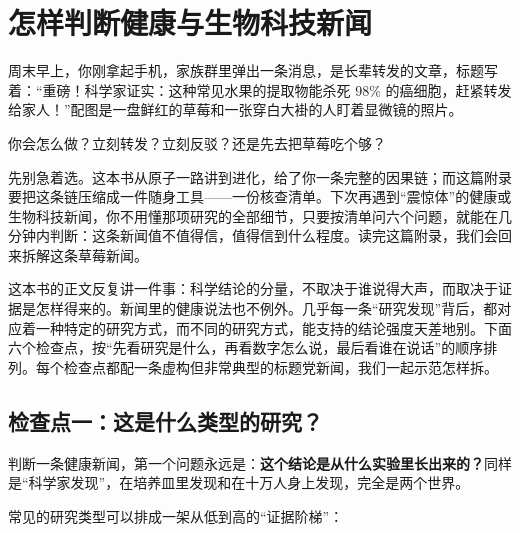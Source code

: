 \chapter{怎样判断健康与生物科技新闻}

\begin{kaichang}
周末早上，你刚拿起手机，家族群里弹出一条消息，是长辈转发的文章，标题写着：“重磅！科学家证实：这种常见水果的提取物能杀死 98\% 的癌细胞，赶紧转发给家人！”配图是一盘鲜红的草莓和一张穿白大褂的人盯着显微镜的照片。

你会怎么做？立刻转发？立刻反驳？还是先去把草莓吃个够？

先别急着选。这本书从原子一路讲到进化，给了你一条完整的因果链；而这篇附录要把这条链压缩成一件随身工具——一份核查清单。下次再遇到“震惊体”的健康或生物科技新闻，你不用懂那项研究的全部细节，只要按清单问六个问题，就能在几分钟内判断：这条新闻值不值得信，值得信到什么程度。读完这篇附录，我们会回来拆解这条草莓新闻。
\end{kaichang}

这本书的正文反复讲一件事：科学结论的分量，不取决于谁说得大声，而取决于证据是怎样得来的。新闻里的健康说法也不例外。几乎每一条“研究发现”背后，都对应着一种特定的研究方式，而不同的研究方式，能支持的结论强度天差地别。下面六个检查点，按“先看研究是什么，再看数字怎么说，最后看谁在说话”的顺序排列。每个检查点都配一条虚构但非常典型的标题党新闻，我们一起示范怎样拆。

\section{检查点一：这是什么类型的研究？}

判断一条健康新闻，第一个问题永远是：\textbf{这个结论是从什么实验里长出来的？}同样是“科学家发现”，在培养皿里发现和在十万人身上发现，完全是两个世界。

常见的研究类型可以排成一架从低到高的“证据阶梯”：

